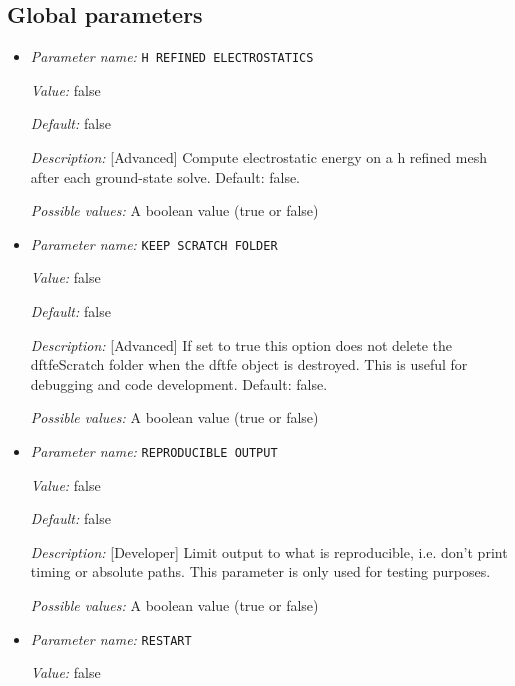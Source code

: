 \subsection{Global parameters}
\label{parameters:global}


\begin{itemize}
\item {\it Parameter name:} {\tt H REFINED ELECTROSTATICS}
\label{parameters:H REFINED ELECTROSTATICS}
\label{parameters:H_20REFINED_20ELECTROSTATICS}


{\it Value:} false


{\it Default:} false


{\it Description:} [Advanced] Compute electrostatic energy on a h refined mesh after each ground-state solve. Default: false.


{\it Possible values:} A boolean value (true or false)
\item {\it Parameter name:} {\tt KEEP SCRATCH FOLDER}
\label{parameters:KEEP SCRATCH FOLDER}
\label{parameters:KEEP_20SCRATCH_20FOLDER}


{\it Value:} false


{\it Default:} false


{\it Description:} [Advanced] If set to true this option does not delete the dftfeScratch folder when the dftfe object is destroyed. This is useful for debugging and code development. Default: false.


{\it Possible values:} A boolean value (true or false)
\item {\it Parameter name:} {\tt REPRODUCIBLE OUTPUT}
\label{parameters:REPRODUCIBLE OUTPUT}
\label{parameters:REPRODUCIBLE_20OUTPUT}


{\it Value:} false


{\it Default:} false


{\it Description:} [Developer] Limit output to what is reproducible, i.e. don't print timing or absolute paths. This parameter is only used for testing purposes.


{\it Possible values:} A boolean value (true or false)
\item {\it Parameter name:} {\tt RESTART}
\label{parameters:RESTART}


{\it Value:} false



\end{itemize}
